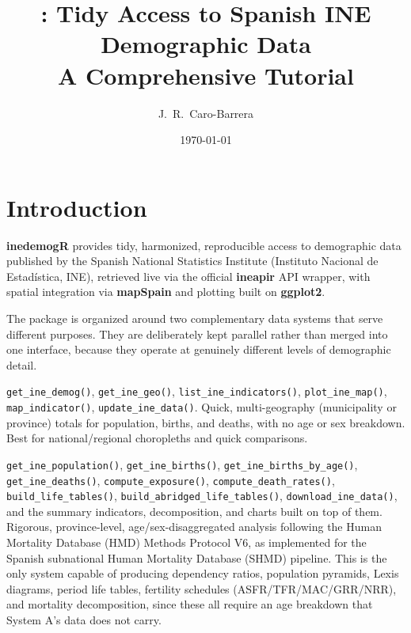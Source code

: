 \documentclass[11pt]{article}
\title{\pkg{inedemogR}: Tidy Access to Spanish INE Demographic Data\\[4pt]
\large A Comprehensive Tutorial}
\author{J.\ R.\ Caro-Barrera}
\date{\today}
\newcommand{\pkg}[1]{\textbf{#1}}
\newcommand{\fn}[1]{\texttt{#1}}
\begin{document}
\maketitle
\tableofcontents
\newpage

\section{Introduction}

\pkg{inedemogR} provides tidy, harmonized, reproducible access to demographic
data published by the Spanish National Statistics Institute (Instituto
Nacional de Estad\'{i}stica, INE), retrieved live via the official
\pkg{ineapir} API wrapper, with spatial integration via \pkg{mapSpain} and
plotting built on \pkg{ggplot2}.

The package is organized around two complementary data systems that serve
different purposes. They are deliberately kept parallel rather than merged
into one interface, because they operate at genuinely different levels of
demographic detail.

\begin{description}[leftmargin=2.2cm,style=nextline]
  \item[System A] \fn{get\_ine\_demog()}, \fn{get\_ine\_geo()},
    \fn{list\_ine\_indicators()}, \fn{plot\_ine\_map()},
    \fn{map\_indicator()}, \fn{update\_ine\_data()}. Quick, multi-geography
    (municipality or province) totals for population, births, and deaths,
    with no age or sex breakdown. Best for national/regional choropleths and
    quick comparisons.
  \item[System B] \fn{get\_ine\_population()}, \fn{get\_ine\_births()},
    \fn{get\_ine\_births\_by\_age()}, \fn{get\_ine\_deaths()},
    \fn{compute\_exposure()}, \fn{compute\_death\_rates()},
    \fn{build\_life\_tables()}, \fn{build\_abridged\_life\_tables()},
    \fn{download\_ine\_data()}, and the summary indicators, decomposition,
    and charts built on top of them. Rigorous, province-level,
    age/sex-disaggregated analysis following the Human Mortality Database
    (HMD) Methods Protocol V6, as implemented for the Spanish subnational
    Human Mortality Database (SHMD) pipeline. This is the only system
    capable of producing dependency ratios, population pyramids, Lexis
    diagrams, period life tables, fertility schedules (ASFR/TFR/MAC/GRR/NRR),
    and mortality decomposition, since these all require an age breakdown
    that System A's data does not carry.
\end{description}
\end{document}
